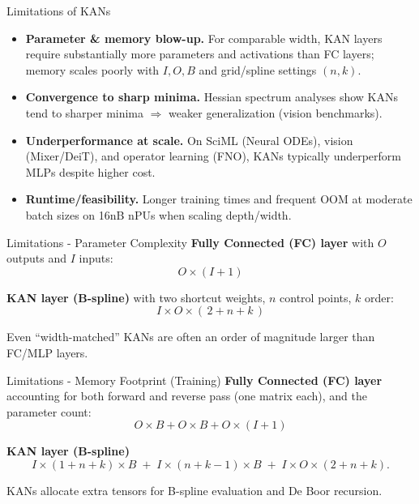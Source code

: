 \documentclass[aspectratio=169]{beamer}
\begin{document}
\begin{frame}{Limitations of KANs}
	\begin{itemize}
		\item \textbf{Parameter \& memory blow-up.} For comparable width, KAN layers require substantially more parameters and activations than FC layers; memory scales poorly with $I,O,B$ and grid/spline settings $(n,k)$.
		\item \textbf{Convergence to sharp minima.} Hessian spectrum analyses show KANs tend to sharper minima $\Rightarrow$ weaker generalization (vision benchmarks).
		\item \textbf{Underperformance at scale.} On SciML (Neural ODEs), vision (Mixer/DeiT), and operator learning (FNO), KANs typically underperform MLPs despite higher cost.
		\item \textbf{Runtime/feasibility.} Longer training times and frequent OOM at moderate batch sizes on 16nB nPUs when scaling depth/width.
	\end{itemize}
\end{frame}


\begin{frame}{Limitations - Parameter Complexity}
	\textbf{Fully Connected (FC) layer} with $O$ outputs and $I$ inputs:
	$$O \times (I+1)$$
	
	\textbf{KAN layer (B-spline)} with two shortcut weights, $n$ control points, $k$ order:
	$$I \times O \times (\,2 + n + k\,)$$
	
	Even ``width-matched'' KANs are often an order of magnitude larger than FC/MLP layers.
\end{frame}


\begin{frame}{Limitations - Memory Footprint (Training)}
	\textbf{Fully Connected (FC) layer} accounting for both forward and reverse pass (one matrix each), and the parameter count:
	$$
	O \times B + O \times B + O \times (I+1)
	$$
	
	\textbf{KAN layer (B-spline)}
	$$
	I  \times (1{+}n{+}k) \times B \;+\; I \times (n{+}k{-}1) \times B \;+\; I \times O \times (2{+}n{+}k).
	$$
	
	KANs allocate extra tensors for B-spline evaluation and De Boor recursion.
\end{frame}

\end{document}
